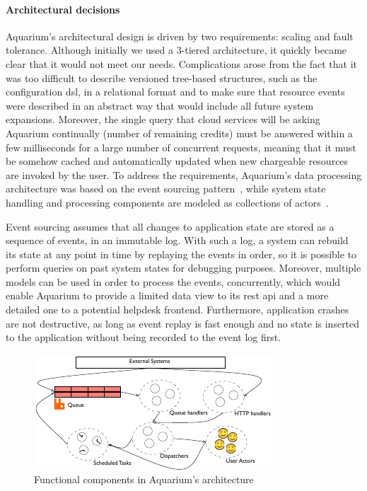 \paragraph{Architectural decisions} Aquarium's
architectural design is driven by two requirements: scaling and fault
tolerance. Although initially we used a 3-tiered architecture, it quickly became clear
that it would not meet our needs.
Complications arose from the fact that it was too difficult to describe
versioned tree-based structures, such as the configuration {\sc dsl},
in a relational format and to
make sure that resource events were described in an abstract way that would
include all future system expansions. Moreover, the single query that cloud
services will be asking Aquarium continually (number of remaining credits) must
be answered within a few milliseconds for a large number of
concurrent requests, meaning that it must be somehow cached and
automatically updated when new chargeable resources are invoked by the user.
To address the requirements, Aquarium's data processing architecture was
based on the event sourcing
pattern~\cite{Fowle05}, while system state handling and processing components
are modeled as collections of actors~\cite{Hewit73}.

Event sourcing assumes that all changes to application
state are stored as a sequence of events, in an immutable log. With such a log,
a system can rebuild its state at any point in time by replaying the
events in order, so it is possible to perform queries on past system states for
debugging purposes. Moreover, multiple models can be used in order to process
the events, concurrently, which would enable Aquarium to provide a limited data
view to its {\sc rest api} and a more detailed one to a potential helpdesk
frontend. Furthermore, application crashes are not destructive, as long as
event replay is fast enough and no state is inserted to the application without
being recorded to the event log first.

\begin{figure}
    \begin{center}
    \includegraphics[scale=1.2]{arch.pdf}
    \end{center}
\caption{Functional components in Aquarium's architecture} 
\label{fig:arch}
\end{figure}

